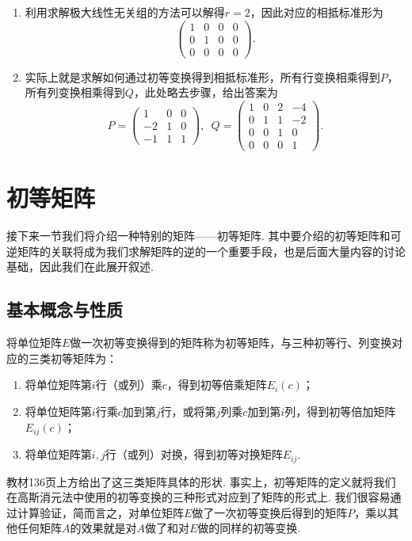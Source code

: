 \begin{solution}
    \begin{enumerate}
        \item 利用求解极大线性无关组的方法可以解得$r=2$，因此对应的相抵标准形为
              \[\begin{pmatrix}
                      1 & 0 & 0 & 0 \\ 0 & 1 & 0 & 0 \\ 0 & 0 & 0 & 0
                  \end{pmatrix}.\]

        \item 实际上就是求解如何通过初等变换得到相抵标准形，所有行变换相乘得到$P$，所有列变换相乘得到$Q$，此处略去步骤，给出答案为
              \[P=\begin{pmatrix}
                      1 & 0 & 0 \\ -2 & 1 & 0 \\ -1 & 1 & 1
                  \end{pmatrix},\enspace Q=\begin{pmatrix}
                      1 & 0 & 2 & -4 \\ 0 & 1 & 1 & -2 \\ 0 & 0 & 1 & 0 \\ 0 & 0 & 0 & 1
                  \end{pmatrix}.\]
    \end{enumerate}
\end{solution}

\section{初等矩阵}

接下来一节我们将介绍一种特别的矩阵——初等矩阵. 其中要介绍的初等矩阵和可逆矩阵的关联将成为我们求解矩阵的逆的一个重要手段，也是后面大量内容的讨论基础，因此我们在此展开叙述.

\subsection{基本概念与性质}

\begin{definition}{}{}
    将单位矩阵$E$做一次初等变换得到的矩阵称为初等矩阵，与三种初等行、列变换对应的三类初等矩阵为：
    \begin{enumerate}
        \item 将单位矩阵第$i$行（或列）乘$c$，得到初等倍乘矩阵$E_i(c)$；

        \item 将单位矩阵第$i$行乘$c$加到第$j$行，或将第$j$列乘$c$加到第$i$列，得到初等倍加矩阵$E_{ij}(c)$；

        \item 将单位矩阵第$i,j$行（或列）对换，得到初等对换矩阵$E_{ij}$.
    \end{enumerate}
\end{definition}
教材136页上方给出了这三类矩阵具体的形状. 事实上，初等矩阵的定义就将我们在高斯消元法中使用的初等变换的三种形式对应到了矩阵的形式上. 我们很容易通过计算验证，简而言之，对单位矩阵$E$做了一次初等变换后得到的矩阵$P$，乘以其他任何矩阵$A$的效果就是对$A$做了和对$E$做的同样的初等变换.

